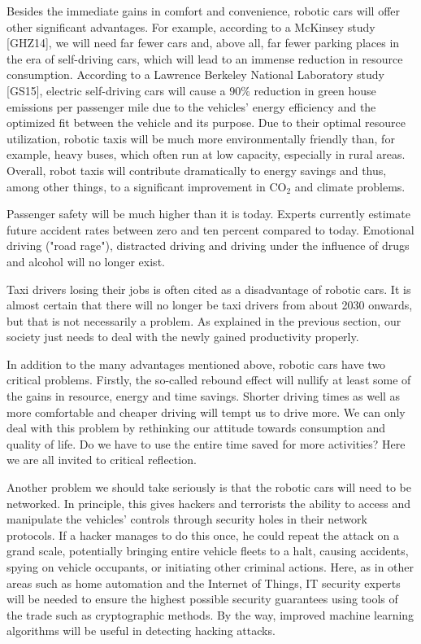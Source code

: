 \documentclass[10pt]{article}
\begin{document}
Besides the immediate gains in comfort and convenience, robotic cars will offer other significant advantages. For example, according to a McKinsey study [GHZ14], we will need far fewer cars and, above all, far fewer parking places in the era of self-driving cars, which will lead to an immense reduction in resource consumption. According to a Lawrence Berkeley National Laboratory study [GS15], electric self-driving cars will cause a $90 \%$ reduction in green house emissions per passenger mile due to the vehicles' energy efficiency and the optimized fit between the vehicle and its purpose. Due to their optimal resource utilization, robotic taxis will be much more environmentally friendly than, for example, heavy buses, which often run at low capacity, especially in rural areas. Overall, robot taxis will contribute dramatically to energy savings and thus, among other things, to a significant improvement in $\mathrm{CO}_{2}$ and climate problems.

Passenger safety will be much higher than it is today. Experts currently estimate future accident rates between zero and ten percent compared to today. Emotional driving ("road rage"), distracted driving and driving under the influence of drugs and alcohol will no longer exist.

Taxi drivers losing their jobs is often cited as a disadvantage of robotic cars. It is almost certain that there will no longer be taxi drivers from about 2030 onwards, but that is not necessarily a problem. As explained in the previous section, our society just needs to deal with the newly gained productivity properly.

In addition to the many advantages mentioned above, robotic cars have two critical problems. Firstly, the so-called rebound effect will nullify at least some of the gains in resource, energy and time savings. Shorter driving times as well as more comfortable and cheaper driving will tempt us to drive more. We can only deal with this problem by rethinking our attitude towards consumption and quality of life. Do we have to use the entire time saved for more activities? Here we are all invited to critical reflection.

Another problem we should take seriously is that the robotic cars will need to be networked. In principle, this gives hackers and terrorists the ability to access and manipulate the vehicles' controls through security holes in their network protocols. If a hacker manages to do this once, he could repeat the attack on a grand scale, potentially bringing entire vehicle fleets to a halt, causing accidents, spying on vehicle occupants, or initiating other criminal actions. Here, as in other areas such as home automation and the Internet of Things, IT security experts will be needed to ensure the highest possible security guarantees using tools of the trade such as cryptographic methods. By the way, improved machine learning algorithms will be useful in detecting hacking attacks.
\end{document}
